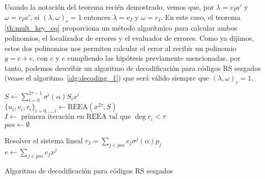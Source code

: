 Usando la notación del teorema recién demostrado, vemos que, por \(\lambda = v_{I}a'\) y \(\omega = r_{I}a'\), si \({{(\lambda, \omega)}_{r} = 1}\) entonces \(\lambda = v_{I}\) y \(\omega = r_{I}\). En este caso, el teorema \ref{th:mult_key_eq} proporciona un método algorítmico para calcular ambos polinomios, el localizador de errores y el evaluador de errores. Como ya dijimos, estos dos polinomios nos permiten calcular el error al recibir un polinomio \(y = c + e\), con \(c\) y \(e\) cumpliendo las hipótesis previamente mencionadas, por tanto, podemos describir un algoritmo de decodificación para códigos RS sesgados (vease el algoritmo~\ref{alg:decoding_1}) que será válido siempre que \({(\lambda, \omega)}_{r} = 1\).

\begin{algorithm}[H]
 \label{alg:decoding_1}
 \(S \gets \sum_{i=0}^{2\tau -1} \sigma^{i}(\alpha)S_{i}x^{i}\)\\
 \({\{u_{i}, v_{i}, r_{i}\}}_{i=0,\ldots,l} \gets \text{REEA}(x^{2\tau}, S)\)\\
 \(I \gets \text{ primera iteración en REEA tal que } \deg r_{i} < \tau\)\\
 \(pos \gets \emptyset\)\\

Resolver el sistema lineal \(r_I = \sum_{j\in pos} e_{j}\sigma^{j}(\alpha)p_{j}\)\\
\(e \gets \sum_{j\in pos}e_{j}x^{j}\)\\
 \caption{Algoritmo de decodificación para códigos RS sesgados}
\end{algorithm}

